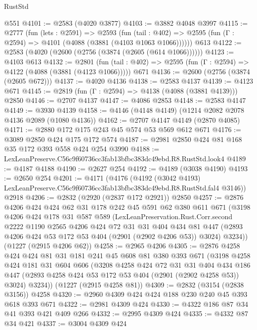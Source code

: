\begin{lexlean}{RustStd}
\begin{coremodule}
    @551
@4101 := @2583 (@4020 @3877)
@4103 := @3882 @4048 @3997
@4115 := @2777
    (fun (lets : @2591) =>
    @2593
      (fun (tail : @402) => @2595 (fun (Γ : @2594) => @4101 (@4088 (@3881 (@4103 @1063 @1066))))))
    @613
@4122 := @2583 (@4020 (@2600 (@2756 (@3874 (@2605 (@614 @1066))))))
@4123 := @4103 @613
@4132 := @2801
    (fun (tail : @402) => @2595 (fun (Γ : @2594) => @4122 (@4088 (@3881 (@4123 @1066)))))
    @671
@4136 := @2600 (@2756 (@3874 (@2605 @672)))
@4137 := @4020 @4136
@4138 := @2583 @4137
@4139 := @4123 @671
@4145 := @2819 (fun (Γ : @2594) => @4138 (@4088 (@3881 @4139))) @2850
@4146 := @2707 @4137
@4147 := @4086 @2853
@4148 := @2583 @4147
@4149 := @3930 @4139
@4158 := @4146 (@4148 @4149) (@1214 @2082 @2078 @4136 @2089 (@1080 @4136))
@4162 := @2707 @4147 @4149 (@2870 @4085)
@4171 := @2880 @172 @175 @243 @45 @574 @53 @569 @612 @671
@4176 := @3089 @2850 @424 @175 @172 @574
@4187 := @2981 @2850 @424 @81 @168 @35 @172 @393 @558 @424 @254 @3990
@4188 := LexLeanPreserve.C56c9f60736cc3fab13bfbc383dc49ebd.R8.RustStd.look4
@4189 := @4187 @4188
@4190 := @2627 @254
@4192 := @4189 (@3038 @4190)
@4193 := @2650 @254
@4201 := @4171
    (@4176
      (@4192 (@3042 @4193) LexLeanPreserve.C56c9f60736cc3fab13bfbc383dc49ebd.R8.RustStd.fal4 @3146))
    @2918
@4206 := @2832 (@2920 (@2837 @172 @2921)) @2850
@4257 := @2876
    @4206
    @424
    @424
    @62
    @31
    @178
    @242
    @45
    @591
    @62
    @380
    @611
    @671
    (@3198
      @4206
      @424
      @178
      @31
      @587
      @589
      (LexLeanPreservation.Rust.Corr.second
        @2222
        @1190
        @2565
        @4206
        @424
        @72
        @31
        @31
        @404
        @434
        @81
        @447
        (@2893 @4206 @424 @53 @172 @53 @404 (@2901 (@2902 @4206 @53)) @3024)
        @3234))
    (@1227 (@2915 @4206 @62))
@4258 := @2965 @4206
@4305 := @2876
    @4258
    @424
    @424
    @81
    @31
    @181
    @241
    @45
    @608
    @81
    @380
    @393
    @671
    (@3198
      @4258
      @424
      @181
      @31
      @604
      @606
      (@3208
        @4258
        @424
        @72
        @31
        @31
        @404
        @434
        @186
        @447
        (@2893 @4258 @424 @53 @172 @53 @404 (@2901 (@2902 @4258 @53)) @3024)
        @3234))
    (@1227 (@2915 @4258 @81))
@4309 := @2832 (@3154 (@2838 @3156)) @4258
@4320 := @2960 @4309 @424 @424 @188 @230 @240 @45 @393 @618 @393 @671
@4322 := @2981 @4309 @424
@4330 := @4322 @186 @87 @34 @41 @393 @421 @409 @266
@4332 := @2995 @4309 @424
@4335 := @4332 @87 @34 @421
@4337 := @3004 @4309 @424

\end{coremodule}
\end{lexlean}
